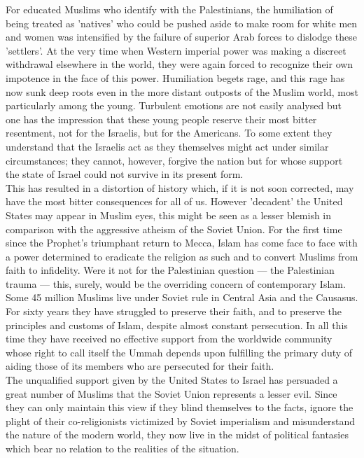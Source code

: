 \documentclass[11pt, b5paper, twoside]{book}
\begin{document}
For educated Muslims who identify with the Palestinians, the humiliation of being treated as 'natives' who could be pushed aside to make room for white men and women was intensified by the failure of superior Arab forces to dislodge these 'settlers'. At the very time when Western imperial power was making a discreet withdrawal elsewhere in the world, they were again forced to recognize their own impotence in the face of this power. Humiliation begets rage, and this rage has now sunk deep roots even in the more distant outposts of the Muslim world, most particularly among the young. Turbulent emotions are not easily analysed but one has the impression that these young people reserve their most bitter resentment, not for the Israelis, but for the Americans. To some extent they understand that the Israelis act as they themselves might act under similar circumstances; they cannot, however, forgive the nation but for whose support the state of Israel could not survive in its present form. \\

This has resulted in a distortion of history which, if it is not soon corrected, may have the most bitter consequences for all of us. However 'decadent' the United States may appear in Muslim eyes, this might be seen as a lesser blemish in comparison with the aggressive atheism of the Soviet Union. For the first time since the Prophet's triumphant return to Mecca, Islam has come face to face with a power determined to eradicate the religion as such and to convert Muslims from faith to infidelity. Were it not for the Palestinian question --- the Palestinian trauma --- this, surely, would be the overriding concern of contemporary Islam. Some 45 million Muslims live under Soviet rule in Central Asia and the Causasus. For sixty years they have struggled to preserve their faith, and to preserve the principles and customs of Islam, despite almost constant persecution. In all this time they have received no effective support from the worldwide community whose right to call itself the Ummah depends upon fulfilling the primary duty of aiding those of its members who are persecuted for their faith. \\

The unqualified support given by the United States to Israel has persuaded a great number of Muslims that the Soviet Union represents a lesser evil. Since they can only maintain this view if they blind themselves to the facts, ignore the plight of their co-religionists victimized by Soviet imperialism and misunderstand the nature of the modern world, they now live in the midst of political fantasies which bear no relation to the realities of the situation. \\
\end{document}
